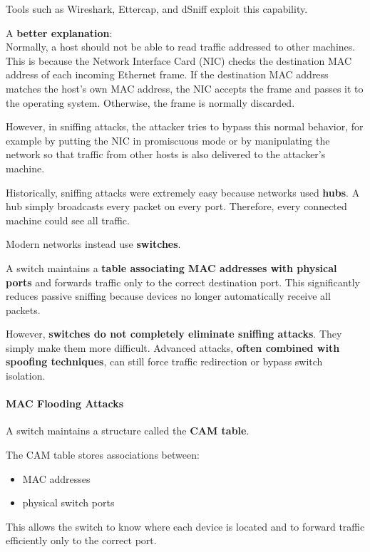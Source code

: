 \documentclass{article}
\begin{document}
Tools such as Wireshark, Ettercap, and dSniff exploit this capability.

A \textbf{better explanation}:\\
Normally, a host should not be able to read traffic addressed to other machines. This is because the Network Interface Card (NIC) checks the destination MAC address of each incoming Ethernet frame. If the destination MAC address matches the host's own MAC address, the NIC accepts the frame and passes it to the operating system. Otherwise, the frame is normally discarded.

However, in sniffing attacks, the attacker tries to bypass this normal behavior, for example by putting the NIC in promiscuous mode or by manipulating the network so that traffic from other hosts is also delivered to the attacker's machine.

Historically, sniffing attacks were extremely easy because networks used \textbf{hubs}. A hub simply broadcasts every packet on every port. Therefore, every connected machine could see all traffic.

Modern networks instead use \textbf{switches}.

A switch maintains a \textbf{table associating MAC addresses with physical ports} and forwards traffic only to the correct destination port. This significantly reduces passive sniffing because devices no longer automatically receive all packets.

However, \textbf{switches do not completely eliminate sniffing attacks}. They simply make them more difficult. Advanced attacks, \textbf{often combined with spoofing techniques}, can still force traffic redirection or bypass switch isolation.

\paragraph{MAC Flooding Attacks}

A switch maintains a structure called the \textbf{CAM table}.

The CAM table stores associations between:

\begin{itemize}
\item MAC addresses
\item physical switch ports
\end{itemize}

This allows the switch to know where each device is located and to forward traffic efficiently only to the correct port.
\end{document}
